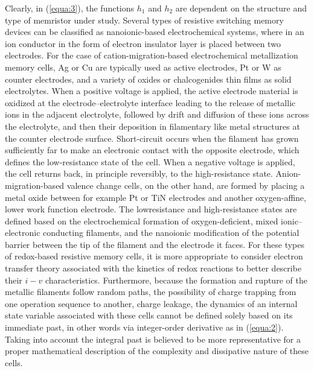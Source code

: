 \documentclass[10pt]{article}
\begin{document}
\begin{multicols}{2}
        Clearly, in (\ref{equa:3}), the functions $h_1$ and $h_2$ are dependent on the structure and type of memristor under study. Several types of resistive switching memory devices can be classified as nanoionic-based electrochemical systems, where in an ion conductor in the form of electron insulator layer is placed between two electrodes. For the case of cation-migration-based electrochemical metallization memory cells, Ag or Cu are typically used as active electrodes, Pt or W as counter electrodes, and a variety of oxides or chalcogenides thin films as solid electrolytes. When a positive voltage is applied, the active electrode material is oxidized at the electrode–electrolyte interface leading to the release of metallic ions in the adjacent electrolyte, followed by drift and diffusion of these ions across the electrolyte, and then their deposition in filamentary like metal structures at the counter electrode surface. Short-circuit occurs when the filament has grown sufficiently far to make an electronic contact with the opposite electrode, which defines the low-resistance state of the cell. When a negative voltage is applied, the cell returns back, in principle reversibly, to the high-resistance state. Anion-migration-based valence change cells, on the other hand, are formed by placing a metal oxide between for example Pt or TiN electrodes and another oxygen-affine, lower work function electrode. The lowresistance and high-resistance states are defined based on the electrochemical formation of oxygen-deficient, mixed ionic–electronic conducting filaments, and the nanoionic modification of the potential barrier between the tip of the filament and the electrode it faces. For these types of redox-based resistive memory cells, it is more appropriate to consider electron transfer theory associated with the kinetics of redox reactions to better describe their $i-v$ characteristics. Furthermore, because the formation and rupture of the metallic filaments follow random paths, the possibility of charge trapping from one operation sequence to another, charge leakage, the dynamics of an internal state variable associated with these cells cannot be defined solely based on its immediate past, in other words via integer-order derivative as in (\ref{equa:2}). Taking into account the integral past is believed to be more representative for a proper mathematical description of the complexity and dissipative nature of these cells. \par

\end{multicols}
\end{document}
